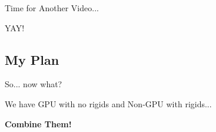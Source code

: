\documentclass[12pt]{beamer}
\begin{document}
\begin{frame}[plain]{}

\begin{center}
\color{white}
\huge{Time for Another Video...} \vspace{16pt} \pause

\small{YAY!}
\end{center}

\end{frame}



\subsection{My Plan}

\begin{frame}{So... now what?}

\begin{center}
We have \pause GPU with no rigids \pause and Non-GPU with rigids... \pause

\vspace{16pt}

\huge{\textbf{Combine Them!}}


\end{center}

\end{frame}

\end{document}
